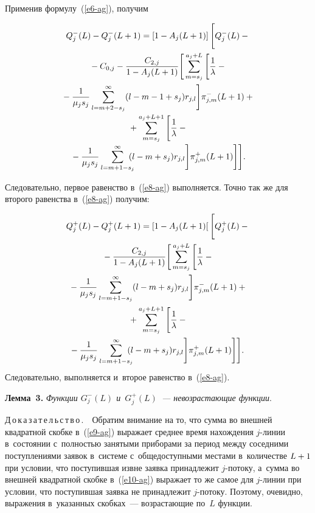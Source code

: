 \begin{multicols}{2}
  \vspace*{-6pt}
  
  \noindent
  Применив формулу~(\ref{e6-ag}), по\-лучим
  
  \vspace*{-10pt}
  
  \noindent
  \begin{multline}
  Q_j^-(L)-Q_j^-(L+1)= \left[ 1-A_j(L+1)\right] \Bigg[ Q_j^-(L)-{}\\
  {}-C_{0,j}- \displaystyle\frac{\displaystyle C_{2,j}\mathstrut}{\displaystyle 1-A_j(L+1)\mathstrut} \Bigg[ \sum\limits_{m=s_j}^{a_j+L} \Bigg[ 
\displaystyle\frac{\displaystyle 1\mathstrut}{\displaystyle \lambda\mathstrut} -{}\\
{}- \displaystyle\frac{\displaystyle 1\mathstrut}{\displaystyle \mu_j s_j\mathstrut} \sum\limits^\infty_{l=m+2-s_j} (l-m-1+s_j) r_{j,l} \Bigg] \pi^-_{j,m}(L+1)+{}
\\[-2pt]
  {}+\sum\limits_{m=s_j}^{a_j+L+1} \Bigg[ \displaystyle\frac{\displaystyle 1\mathstrut}{\displaystyle \lambda\mathstrut} -{}\\[-2pt]
  {}- \displaystyle\frac{\displaystyle 1\mathstrut}{\displaystyle \mu_j s_j\mathstrut} 
\sum\limits^\infty_{l=m+1-s_j} \!\!\!\! (l-m+s_j) r_{j,l}\Bigg] \pi^+_{j,m}(L+1)\Bigg] 
\Bigg].
  \label{e9-ag}
  \end{multline}
  
  Следовательно, первое равенство в~(\ref{e8-ag}) выполняется. Точ\-но так же 
для второго равенства в~(\ref{e8-ag}) по\-лучим:

  \vspace*{-6pt}
  
  \noindent
  \begin{multline}
  Q_j^+(L) -Q_j^+(L+1) =\left[ 1-A_j(L+1)\right[ \Bigg[ Q_j^+(L)-{}\\
  {}- \displaystyle\frac{\displaystyle C_{2,j}\mathstrut}{\displaystyle 1-A_j(L+1)\mathstrut} \Bigg[ \sum\limits_{m=s_j}^{a_j+L} \Bigg[
  \displaystyle\frac{\displaystyle 1\mathstrut}{\displaystyle \lambda\mathstrut} -{}\\
  {}-\displaystyle\frac{\displaystyle 1\mathstrut}{\displaystyle \mu_j s_j\mathstrut} \sum\limits^\infty_{l=m+1-s_j} (l-m+s_j) 
r_{j,l}\Bigg] \pi^-_{j,m} (L+1)+{}\\
  {}+\sum\limits_{m=s_j}^{a_j+L+1} \Bigg[ \displaystyle\frac{\displaystyle 1\mathstrut}{\displaystyle \lambda\mathstrut} -{}\\
 \!\! {}-\displaystyle\frac{\displaystyle 1\mathstrut}{\displaystyle \mu_j s_j\mathstrut} 
\sum\limits^\infty_{l=m+1-s_j} \!\!\!\!(l-m+s_j) r_{j,l}\Bigg] \pi^+_{j,m} (L+1)\Bigg] 
\Bigg].
  \label{e10-ag}
  \end{multline}
Следовательно, выполняется и~второе равенство в~(\ref{e8-ag}).

  \smallskip
  
  \noindent
  \textbf{Лемма~3.} \textit{Функции $G_j^-(L)$ и~$G_j^+(L)$~--- 
не\-воз\-рас\-та\-ющие функ\-ции}.
  
  \smallskip
  
  \noindent
  Д\,о\,к\,а\,з\,а\,т\,е\,л\,ь\,с\,т\,в\,о\,.\ \ Обратим внимание на то, что 
сумма во внеш\-ней квад\-рат\-ной скоб\-ке в~(\ref{e9-ag}) выражает сред\-нее время 
на\-хож\-де\-ния $j$-ли\-нии в~со\-сто\-янии с~пол\-ностью занятыми приборами за 
период меж\-ду соседними по\-ступ\-ле\-ни\-ями заявок в~сис\-те\-ме 
с~об\-ще\-до\-ступ\-ны\-ми местами в~количестве $L\hm+1$ при условии, что 
по\-сту\-пив\-шая из\-вне за\-яв\-ка принадлежит $j$-по\-то\-ку, а~сумма во внеш\-ней 
квад\-рат\-ной скоб\-ке в~(\ref{e10-ag}) выражает то же самое для $j$-ли\-нии при 
условии, что по\-сту\-пив\-шая заявка не принадлежит $j$-по\-то\-ку. Поэтому, 
очевидно, выражения в~указанных скоб\-ках~--- воз\-рас\-та\-ющие по~$L$ 
функ\-ции. 
  

\end{multicols}
